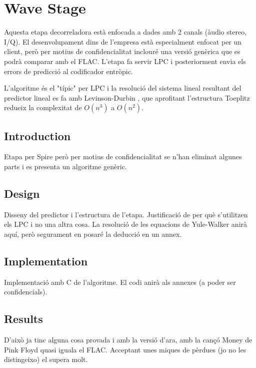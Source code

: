 \chapter{Wave Stage}
Aquesta etapa decorreladora està enfocada a dades amb 2 canals (àudio stereo, I/Q). El desenvolupament dins de l'empresa està especialment enfocat per un client, però per motius de confidencialitat inclouré una versió genèrica que es podrà comparar amb el FLAC. L'etapa fa servir LPC i posteriorment envia els errors de predicció al codificador entròpic.

L'algoritme és el "típic" per LPC i la resolució del sistema lineal resultant del predictor lineal \parencite{PSAVC} es fa amb Levinson-Durbin \parencite{LevinsonDurbin}, que aprofitant l'estructura Toeplitz redueix la complexitat de $O(n^3)$ a $O(n^2)$.

\section{Introduction}
Etapa per Spire però per motius de confidencialitat se n'han eliminat algunes parts i es presenta un algoritme genèric.

\section{Design}
Disseny del predictor i l'estructura de l'etapa. Justificació de per què s'utilitzen els LPC i no una altra cosa. La resolució de les equacions de Yule-Walker anirà aquí, però segurament en posaré la deducció en un annex.

\section{Implementation}
Implementació amb C de l'algoritme. El codi anirà als annexes (a poder ser confidencials).

\section{Results}
D'això ja tinc alguna cosa provada i amb la versió d'ara, amb la cançó Money de Pink Floyd quasi iguala el FLAC. Acceptant unes miques de pèrdues (jo no les distingeixo) el supera molt.